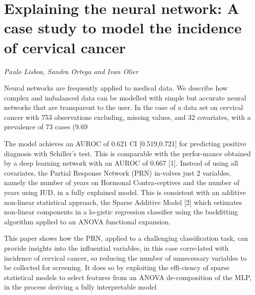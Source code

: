 \documentclass[../booklet.tex]{subfiles}
\begin{document}
\section[Explaining the neural network: A case study to model the incidence of cervical cancer. {\it Paulo Lisboa, Sandra Ortega and Ivan Olier}]{Explaining the neural network: A case study to model the incidence of cervical cancer}
  

\begin{center}
  {\it Paulo Lisboa, Sandra Ortega and Ivan Olier}
\end{center}

\vskip 0.8cm

Neural networks are frequently applied to medical data. We describe how complex and imbalanced data can be modelled with simple but accurate neural networks that are transparent to the user. In the case of a data set on cervical cancer with 753 observations excluding, missing values, and 32 covariates, with a prevalence of 73 cases (9.69%

     The model achieves an AUROC of 0.621 CI [0.519,0.721] for predicting positive diagnosis with Schiller's test.  This is comparable with the perfor-mance obtained by a deep learning network with an AUROC of 0.667 [1]. Instead of using all covariates, the Partial Response Network (PRN) in-volves just 2 variables, namely the number of years on Hormonal Contra-ceptives and the number of years using IUD, in a fully explained model. This is consistent with an additive non-linear statistical approach, the Sparse Additive Model [2] which estimates non-linear components in a lo-gistic regression classifier using the backfitting algorithm applied to an ANOVA functional expansion.

     This paper shows how the PRN, applied to a challenging classification task, can provide insights into the influential variables, in this case corre-lated with incidence of cervical cancer, so reducing the number of unnecessary variables to be collected for screening. It does so by exploiting the effi-ciency of sparse statistical models to select features from an ANOVA de-composition of the MLP, in the process deriving a fully interpretable model

\end{document}
